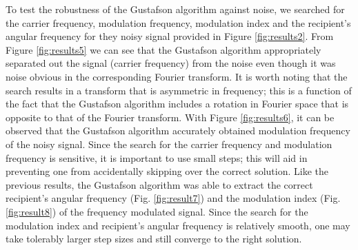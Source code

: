 \documentclass[onecolumn, groupedaddress, 10pt]{revtex4-1}
\begin{document}
To test the  robustness of the Gustafson algorithm against noise, we searched for the carrier frequency, modulation frequency, modulation index and the recipient's angular frequency for they noisy signal provided in Figure \ref{fig:results2}. From Figure \ref{fig:results5} we can see that the Gustafson algorithm appropriately separated out the signal (carrier frequency) from the noise even though it was noise obvious in the corresponding Fourier transform. It is worth noting that the search results in a transform that is asymmetric in frequency; this is a function of the fact that the Gustafson algorithm includes a rotation in Fourier space that is opposite to that of the Fourier transform. With Figure \ref{fig:results6}, it can be observed that the Gustafson algorithm accurately obtained modulation frequency of the noisy signal. Since the search for the carrier frequency and modulation frequency is sensitive, it is important to use small steps; this will aid in preventing one from accidentally skipping over the correct solution. Like the previous results, the Gustafson algorithm was able to extract the correct recipient's angular frequency (Fig. \ref{fig:result7}) and the modulation index (Fig. \ref{fig:result8}) of the frequency modulated signal. Since the search for the modulation index and recipient's angular frequency is relatively smooth, one may take tolerably larger step sizes and still converge to the right solution.
\end{document}
